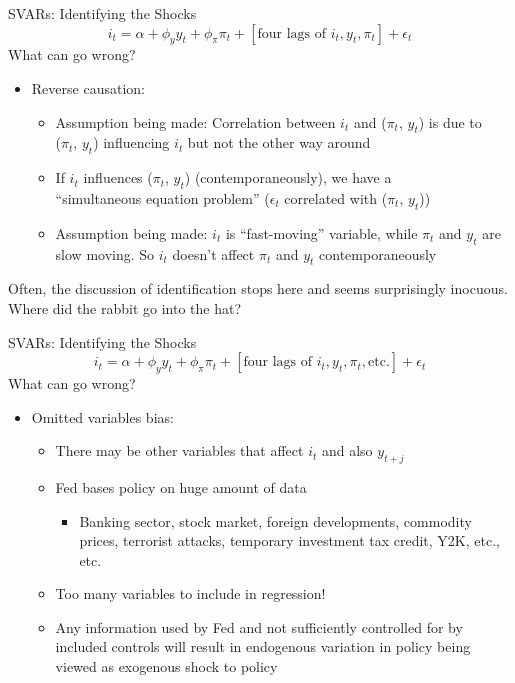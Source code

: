 \documentclass[11pt,aspectratio=169,xcolor={dvipsnames},hyperref={pdftex,pdfpagemode=UseNone,hidelinks,pdfdisplaydoctitle=true},usepdftitle=false]{beamer}
\begin{document}
\begin{frame}{SVARs: Identifying the Shocks}
	\[ i_{t} = \alpha + \phi_{y} y_{t} + \phi_{\pi} \pi_{t} + [\mbox{four lags of } i_{t}, y_{t}, \pi_{t}] + \epsilon_{t} \]
	What can go wrong? \pause
	\begin{itemize}
		\item Reverse causation:
		\begin{itemize}
			\item Assumption being made: Correlation between $i_{t}$ and ($\pi_{t}$, $y_{t}$) is due to \\ ($\pi_{t}$, $y_{t}$) influencing $i_{t}$ but not the other way around
			\item If $i_{t}$ influences ($\pi_{t}$, $y_{t}$) (contemporaneously), we have a \\ ``simultaneous equation problem'' ($\epsilon_{t}$ correlated with ($\pi_{t}$, $y_{t}$))
			\item Assumption being made: $i_{t}$ is ``fast-moving'' variable, while $\pi_{t}$ and $y_{t}$ are slow moving. So $i_{t}$ doesn't affect $\pi_{t}$ and $y_{t}$ contemporaneously
		\end{itemize} 
	\end{itemize} \pause
	Often, the discussion of identification stops here and seems surprisingly inocuous. Where did the rabbit go into the hat?
\end{frame}


\begin{frame}{SVARs: Identifying the Shocks}
	\[ i_{t} = \alpha + \phi_{y} y_{t} + \phi_{\pi} \pi_{t} + [\mbox{four lags of } i_{t}, y_{t}, \pi_{t}, \mbox{etc.}] + \epsilon_{t} \]
	What can go wrong?
	\begin{itemize}
		\addtocounter{enumi}{1}
		\item Omitted variables bias:
		\begin{itemize}
\item There may be other variables that affect $i_{t}$ and also $y_{t+j}$
\item Fed bases policy on huge amount of data
\begin{itemize}
\item Banking sector, stock market, foreign developments, commodity prices, terrorist attacks, temporary investment tax credit, Y2K, etc., etc. 
\end{itemize}
\item Too many variables to include in regression!
\item Any information used by Fed and not sufficiently controlled for by \\ included controls will result in endogenous variation in policy being \\ viewed as exogenous shock to policy
		\end{itemize}
	\end{itemize}
\end{frame}
\end{document}
